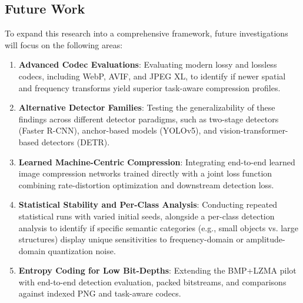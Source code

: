 \documentclass[12pt, a4paper]{article}
\begin{document}
\subsection{Future Work}
To expand this research into a comprehensive framework, future investigations will focus on the following areas:
\begin{enumerate}
    \item \textbf{Advanced Codec Evaluations}: Evaluating modern lossy and lossless codecs, including WebP, AVIF, and JPEG XL, to identify if newer spatial and frequency transforms yield superior task-aware compression profiles.
    \item \textbf{Alternative Detector Families}: Testing the generalizability of these findings across different detector paradigms, such as two-stage detectors (Faster R-CNN), anchor-based models (YOLOv5), and vision-transformer-based detectors (DETR).
    \item \textbf{Learned Machine-Centric Compression}: Integrating end-to-end learned image compression networks trained directly with a joint loss function combining rate-distortion optimization and downstream detection loss.
    \item \textbf{Statistical Stability and Per-Class Analysis}: Conducting repeated statistical runs with varied initial seeds, alongside a per-class detection analysis to identify if specific semantic categories (e.g., small objects vs. large structures) display unique sensitivities to frequency-domain or amplitude-domain quantization noise.
    \item \textbf{Entropy Coding for Low Bit-Depths}: Extending the BMP+LZMA pilot with end-to-end detection evaluation, packed bitstreams, and comparisons against indexed PNG and task-aware codecs.
\end{enumerate}
\end{document}
